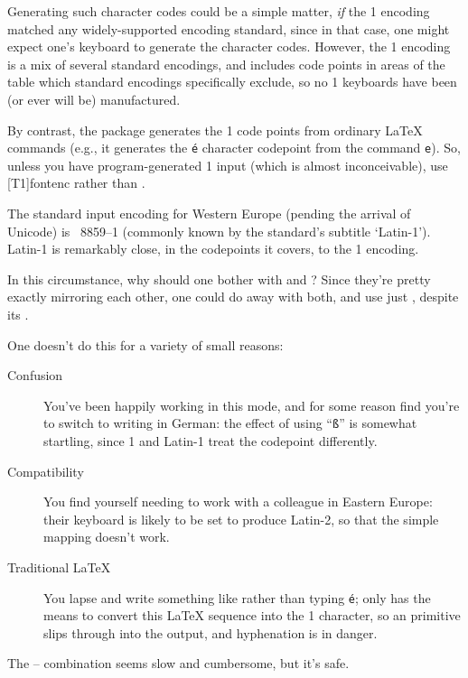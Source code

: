 Generating such character codes could be a simple matter, \emph{if}
the 1 encoding matched any widely-supported encoding standard,
since in that case, one might expect one's keyboard to generate the
character codes.  However, the 1 encoding is a mix of several
standard encodings, and includes code points in areas of the table
which standard encodings specifically exclude, so no 1
keyboards have been (or ever will be) manufactured.

By contrast, the  package generates the 1
code points from ordinary \LaTeX{} commands (e.g., it generates the
\texttt{\'e} character codepoint from the command \texttt{e}).
So, unless you have program-generated 1 input (which is almost
inconceivable), use [T1]{fontenc} rather than
.


The standard input encoding for Western Europe (pending the arrival of
Unicode) is ~8859--1 (commonly known by the standard's
subtitle `Latin-1').  Latin-1 is remarkably close, in the codepoints
it covers, to the \AllTeX{} 1 encoding.

In this circumstance, why should one bother with 
and ?  Since they're pretty exactly mirroring each
other, one could do away with both, and use just ,
despite its .

One doesn't do this for a variety of small reasons:
\begin{description}
\item[Confusion] You've been happily working in this mode, and for
  some reason find you're to switch to writing in German: the effect
  of using ``\texttt{\ss }'' is somewhat startling, since 1
  and Latin-1 treat the codepoint differently.
\item[Compatibility] You find yourself needing to work with a
  colleague in Eastern Europe: their keyboard is likely to be set to
  produce Latin-2, so that the simple mapping doesn't work.
\item[Traditional \LaTeX{}] You lapse and write something like
   rather than typing \texttt{\'e}; only 
  has the means to convert this \LaTeX{} sequence into the 1
  character, so an  primitive slips through into the
  output, and hyphenation is in danger.
\end{description}
The -- combination seems slow and
cumbersome, but it's safe.

